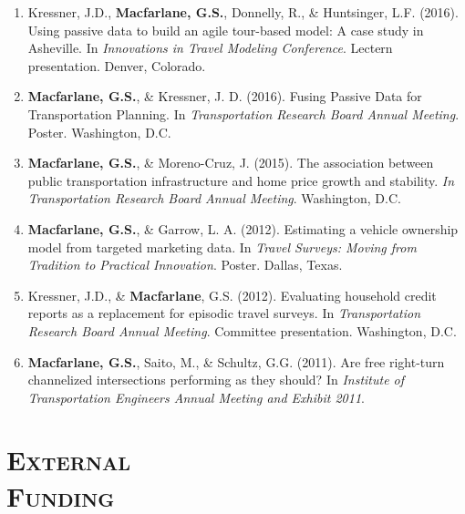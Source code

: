 \documentclass[margin,line]{res}
\newif\ifdetail
\newcounter{enuminitialize}
\newenvironment{myenum}[1][]
{%
 \setcounter{enuminitialize}{#1}
 \addtocounter{enuminitialize}{2}
 \begin{enumerate}[left= 4pt, itemsep=8pt, start=\value{enuminitialize}, label=\arabic*\addtocounter{enumi}{-2}]
}
{%
 \end{enumerate}
}
\newcommand{\secfont}{\scshape }
\begin{document}
\begin{resume}
\begin{myenum}[33]
\item Kressner, J.D., \textbf{Macfarlane, G.S.}, Donnelly, R., \& Huntsinger, L.F. (2016). Using passive data to build an agile tour-based model: A case study in Asheville. In \textit{ Innovations in Travel Modeling Conference}. Lectern presentation. Denver, Colorado. \ifdetail Citations: 7  \fi
\item \textbf{Macfarlane, G.S.}, \& Kressner, J. D. (2016). Fusing Passive Data for Transportation Planning. In \textit{ Transportation Research Board Annual Meeting}. Poster. Washington, D.C.
\item \textbf{Macfarlane, G.S.}, \& Moreno-Cruz, J. (2015). The association between public transportation infrastructure and home price growth and stability. \textit{ In Transportation Research Board Annual Meeting}. Washington, D.C.
\item \textbf{Macfarlane, G.S.}, \& Garrow, L. A. (2012). Estimating a vehicle ownership model from targeted marketing data. In \textit{ Travel Surveys: Moving from Tradition to Practical Innovation}. Poster. Dallas, Texas.
\item Kressner, J.D., \& \textbf{Macfarlane}, G.S. (2012). Evaluating household credit reports as a replacement for episodic travel surveys. In \textit{ Transportation Research Board Annual Meeting}. Committee presentation. Washington, D.C.
\item \textbf{Macfarlane, G.S.}, Saito, M., \& Schultz, G.G. (2011). Are free right-turn channelized intersections performing as they should? In \textit{ Institute of Transportation Engineers Annual Meeting and Exhibit 2011}.
\end{myenum}



\noindent\makebox[\linewidth]{\rule{\linewidth}{0.4pt}}
\section{\secfont External \\Funding}


\end{resume}
\end{document}
